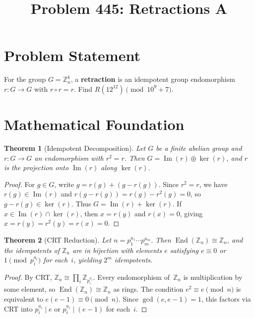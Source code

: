 \documentclass[12pt]{article}
\title{Problem 445: Retractions A}
\author{}
\date{}
\newtheorem{theorem}{Theorem}
\begin{document}
\maketitle

\section{Problem Statement}
For the group $G = \mathbb{Z}_n^k$, a \textbf{retraction} is an idempotent group endomorphism $r \colon G \to G$ with $r \circ r = r$. Find $R(12^{12}) \pmod{10^9 + 7}$.

\section{Mathematical Foundation}

\begin{theorem}[Idempotent Decomposition]
Let $G$ be a finite abelian group and $r \colon G \to G$ an endomorphism with $r^2 = r$. Then $G = \operatorname{Im}(r) \oplus \ker(r)$, and $r$ is the projection onto $\operatorname{Im}(r)$ along $\ker(r)$.
\end{theorem}

\begin{proof}
For $g \in G$, write $g = r(g) + (g - r(g))$. Since $r^2 = r$, we have $r(g) \in \operatorname{Im}(r)$ and $r(g - r(g)) = r(g) - r^2(g) = 0$, so $g - r(g) \in \ker(r)$. Thus $G = \operatorname{Im}(r) + \ker(r)$. If $x \in \operatorname{Im}(r) \cap \ker(r)$, then $x = r(y)$ and $r(x) = 0$, giving $x = r(y) = r^2(y) = r(x) = 0$.
\end{proof}

\begin{theorem}[CRT Reduction]
Let $n = p_1^{a_1} \cdots p_m^{a_m}$. Then $\operatorname{End}(\mathbb{Z}_n) \cong \mathbb{Z}_n$, and the idempotents of $\mathbb{Z}_n$ are in bijection with elements $e$ satisfying $e \equiv 0$ or~$1 \pmod{p_i^{a_i}}$ for each~$i$, yielding $2^m$ idempotents.
\end{theorem}

\begin{proof}
By CRT, $\mathbb{Z}_n \cong \prod_i \mathbb{Z}_{p_i^{a_i}}$. Every endomorphism of~$\mathbb{Z}_n$ is multiplication by some element, so $\operatorname{End}(\mathbb{Z}_n) \cong \mathbb{Z}_n$ as rings. The condition $e^2 \equiv e \pmod{n}$ is equivalent to $e(e-1) \equiv 0 \pmod{n}$. Since $\gcd(e, e-1) = 1$, this factors via CRT into $p_i^{a_i} \mid e$ or $p_i^{a_i} \mid (e-1)$ for each~$i$.
\end{proof}
\end{document}
